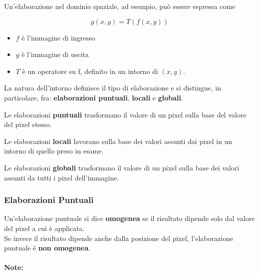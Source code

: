 Un'elaborazione nel dominio spaziale, ad esempio, può essere
espressa come

$$
    g(x , y) = T(f (x , y))
$$

\begin{itemize}
    \item $f$ è l'immagine di ingresso
    \item $g$ è l'immagine di uscita
    \item $T$ è un operatore su f, definito in un intorno di $(x , y)$.
\end{itemize}

La natura dell'intorno definisce il tipo di elaborazione e si distingue,
in particolare, fra: \textbf{elaborazioni puntuali}, \textbf{locali} e \textbf{globali}.

\begin{definition}
    Le elaborazioni \textbf{puntuali} trasformano il valore di un pixel sulla base del
    valore del pixel stesso.
\end{definition}

\begin{definition}
    Le elaborazioni \textbf{locali} lavorano sulla base dei valori assunti dai pixel in
    un intorno di quello preso in esame.
\end{definition}

\begin{definition}
    Le elaborazioni \textbf{globali} trasformano il valore di un pixel sulla
    base dei valori assunti da tutti i pixel dell'immagine.
\end{definition}

\subsubsection{Elaborazioni Puntuali}

\begin{definition}
    Un'elaborazione puntuale si dice \textbf{omogenea} se il risultato
    dipende solo dal valore del pixel a cui è applicata.\\
    Se invece il risultato dipende anche dalla posizione del pixel,
    l'elaborazione puntuale è \textbf{non omogenea}.
\end{definition}

\paragraph{Note:}

